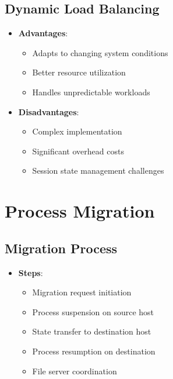 \documentclass[12pt]{article}
\begin{document}
\subsection{Dynamic Load Balancing}
\begin{itemize}
\item \textbf{Advantages}:
  \begin{itemize}
  \item Adapts to changing system conditions
  \item Better resource utilization
  \item Handles unpredictable workloads
  \end{itemize}
  
\item \textbf{Disadvantages}:
  \begin{itemize}
  \item Complex implementation
  \item Significant overhead costs
  \item Session state management challenges
  \end{itemize}
\end{itemize}

\section{Process Migration}

\subsection{Migration Process}
\begin{itemize}
\item \textbf{Steps}:
  \begin{itemize}
  \item Migration request initiation
  \item Process suspension on source host
  \item State transfer to destination host
  \item Process resumption on destination
  \item File server coordination
  \end{itemize}
\end{itemize}
\end{document}
